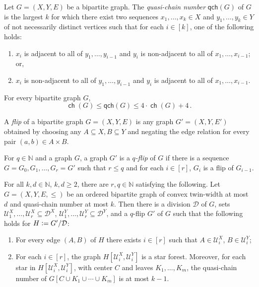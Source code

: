 \documentclass{article}
\newcommand{\define}{\vcentcolon=}
\newcommand{\cD}{\ensuremath{\mathcal{D}}}
\newcommand{\cU}{\ensuremath{\mathcal{U}}}
\newcommand{\bN}{\ensuremath{\mathbb{N}}}
\DeclareMathOperator\ch{\mathsf{ch}}
\begin{document}
\newcommand{\qch}{\mathsf{qch}}
\begin{definition}
Let $G = (X,Y,E)$ be a bipartite graph. The \emph{quasi-chain number} $\qch(G)$ of $G$ is the largest $k$ for which
there exist two sequences $x_1, \dotsc, x_k \in X$ and $y_1, \dotsc, y_k \in Y$ of not necessarily distinct vertices such that for each $i\in [k]$, one of the following holds:
\begin{enumerate}
\item $x_i$ is adjacent to all of $y_1, \dotsc, y_{i-1}$ and $y_i$ is non-adjacent to all of $x_1,
\dotsc, x_{i-1}$; or,
\item $x_i$ is non-adjacent to all of $y_1, \dotsc, y_{i-1}$ and $y_i$ is adjacent to all of $x_1,
\dotsc, x_{i-1}$.
\end{enumerate}
\end{definition}

\begin{lemma}
\label{lemma:quasi chain number}
For every bipartite graph $G$,
\[
  \ch(G) \leq \qch(G) \leq 4 \cdot \ch(G) + 4 \,.
\]
\end{lemma}

\begin{definition}[Flip]
A \emph{flip} of a bipartite graph $G = (X,Y,E)$ is any graph $G' = (X,Y,E')$ obtained by choosing
any $A \subseteq X, B \subseteq Y$ and negating the edge relation for every pair $(a,b) \in A \times
B$.

For $q \in \bN$ and a graph $G$, a graph $G'$ is a \emph{$q$-flip} of $G$ if there is a sequence $G
= G_0, G_1, \dotsc, G_r = G'$ such that $r \leq q$ and for each $i \in [r]$, $G_i$ is a flip of
$G_{i-1}$.
\end{definition}

\begin{lemma}
\label{lemma:gpt21 main}
For all $k,d \in \bN$, $k,d \geq 2$, there are $r,q \in \bN$ satisfying the following. Let $G =
(X,Y,E, \leq)$ be an ordered bipartite graph of convex twin-width at most $d$ and quasi-chain number
at most $k$. Then there is a division $\cD$ of $G$, 
sets $\cU^X_1, \dotsc, \cU^X_r \subseteq \cD^X$,
$\cU^Y_1, \dotsc, \cU^Y_r \subseteq \cD^Y$,
and a $q$-flip $G'$ of $G$ such that the following holds for $H \define G' / \cD$:
\begin{enumerate}
\item For every edge $(A,B)$ of $H$ there exists $i \in [r]$ such that $A\in\cU^X_i$, $B \in \cU^Y_i$;
\item For each $i\in[r]$, the graph $H[\cU^X_i,\cU^Y_i]$ is a star forest. 
	Moreover, for each star in $H[\cU^X_i,\cU^Y_i]$,
	with center $C$ and leaves $K_1, \dotsc, K_m$, 
	the quasi-chain number of $G[C \cup K_1 \cup \dotsm \cup K_m]$ is at most $k-1$.
\end{enumerate}
\end{lemma}
\end{document}
